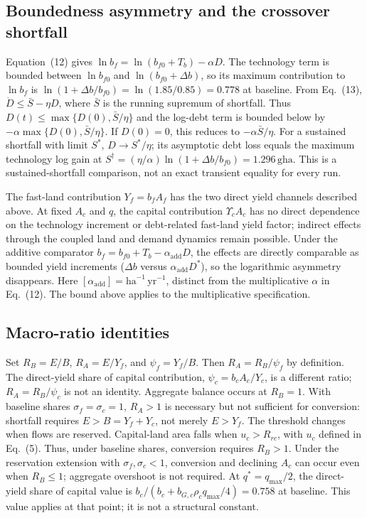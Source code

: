 \documentclass[11pt,a4paper]{article}
\newcommand{\Ups}{\Upsilon_c}
\begin{document}
\subsection{Boundedness asymmetry and the crossover shortfall}\label{si:bounded}

Equation~(12) gives $\ln b_f=\ln(b_{f0}+T_b)-\alpha D$. The technology term is bounded between $\ln b_{f0}$ and $\ln(b_{f0}+\Delta b)$, so its maximum contribution to $\ln b_f$ is $\ln(1+\Delta b/b_{f0})=\ln(1.85/0.85)=0.778$ at baseline. From Eq.~(13), $\dot D\le\bar S-\eta D$, where $\bar S$ is the running supremum of shortfall. Thus $D(t)\le\max\{D(0),\bar S/\eta\}$ and the log-debt term is bounded below by $-\alpha\max\{D(0),\bar S/\eta\}$. If $D(0)=0$, this reduces to $-\alpha\bar S/\eta$. For a sustained shortfall with limit $S^*$, $D\to S^*/\eta$; its asymptotic debt loss equals the maximum technology log gain at $S^\dagger=(\eta/\alpha)\ln(1+\Delta b/b_{f0})=1.296\,\mathrm{gha}$. This is a sustained-shortfall comparison, not an exact transient equality for every run.

The fast-land contribution $Y_f=b_fA_f$ has the two direct yield channels described above. At fixed $A_c$ and $q$, the capital contribution $\Ups A_c$ has no direct dependence on the technology increment or debt-related fast-land yield factor; indirect effects through the coupled land and demand dynamics remain possible. Under the additive comparator $b_f=b_{f0}+T_b-\alpha_{\mathrm{add}}D$, the effects are directly comparable as bounded yield increments ($\Delta b$ versus $\alpha_{\mathrm{add}}D^*$), so the logarithmic asymmetry disappears. Here $[\alpha_{\mathrm{add}}]=\mathrm{ha}^{-1}\,\mathrm{yr}^{-1}$, distinct from the multiplicative $\alpha$ in Eq.~(12). The bound above applies to the multiplicative specification.

\subsection{Macro-ratio identities}\label{si:ratios}

Set $R_B=E/B$, $R_A=E/Y_f$, and $\psi_f=Y_f/B$. Then $R_A=R_B/\psi_f$ by definition. The direct-yield share of capital contribution, $\psi_c=b_cA_c/Y_c$, is a different ratio; $R_A=R_B/\psi_c$ is not an identity. Aggregate balance occurs at $R_B=1$. With baseline shares $\sigma_f=\sigma_c=1$, $R_A>1$ is necessary but not sufficient for conversion: shortfall requires $E>B=Y_f+Y_c$, not merely $E>Y_f$. The threshold changes when flows are reserved. Capital-land area falls when $u_c>R_{rc}$, with $u_c$ defined in Eq.~(5). Thus, under baseline shares, conversion requires $R_B>1$. Under the reservation extension with $\sigma_f,\sigma_c<1$, conversion and declining $A_c$ can occur even when $R_B\le1$; aggregate overshoot is not required. At $q^*=q_{\max}/2$, the direct-yield share of capital value is $b_c/(b_c+b_{G,c}\rho_cq_{\max}/4)=0.758$ at baseline. This value applies at that point; it is not a structural constant.
\end{document}
